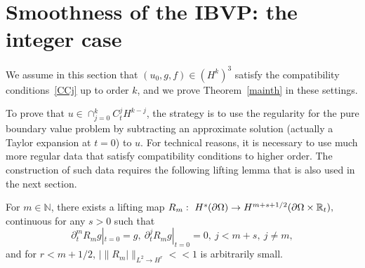 \documentclass[AHL,Unicode,longabstracts,published]{cedram}
\newcommand{\R}{\mathbb{R}}
\newcommand{\N}{\mathbb{N}}
\newcommand{\N}{\mathbb{N}}
\begin{document}
\section{Smoothness of the IBVP: the integer case}\label{sect4}

We assume in this section that $(u_0,g,f)\in (H^k)^3$ satisfy the compatibility conditions~\eqref{CCj} up to order $k$, and we prove Theorem~\ref{mainth} in these settings.


To prove that $u\in \cap_{j=0}^k C_t^jH^{k-j}$, the strategy is to use the regularity for the pure boundary value problem by subtracting an approximate solution (actually a Taylor expansion at $t=0$) to $u$. For technical reasons, it is necessary to use much more regular data that satisfy compatibility conditions to higher order. The construction of such data requires the following lifting lemma that is also used in the next section.

\begin{lemm}\label{releve}
For $m\in \N$, there exists a lifting map $R_m:\ H^{s}(\partial\Omega)\to H^{m+s+1/2}\linebreak(\partial\Omega\times \R_t),$ continuous for any $s>0$ such that
\begin{equation}\label{trace}
\partial_t^{m}R_mg|_{t=0}=g,\ \partial_t^jR_mg|_{t=0}=0,\ j<m+s,
\ j\neq m,
\end{equation}
and for $r<m+1/2$, $|\|R_m|\|_{L^2\to H^r}<<1$ is arbitrarily small.
\end{lemm}
\end{document}
